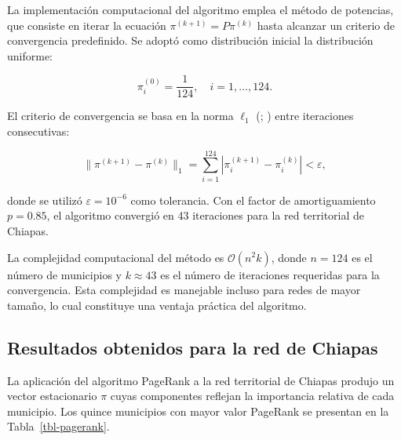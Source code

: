 \documentclass[
  spanish,
  us-letterpaper,
]{scrreprt}
\numberwithin{equation}{section}
\begin{document}
La implementación computacional del algoritmo emplea el método de
potencias, que consiste en iterar la ecuación
\(\pi^{(k+1)} = P\pi^{(k)}\) hasta alcanzar un criterio de convergencia
predefinido. Se adoptó como distribución inicial la distribución
uniforme:

\[
\pi^{(0)}_i = \frac{1}{124}, \quad i = 1, \dots, 124.
\]

El criterio de convergencia se basa en la norma \(\ell_1\)
(;
) entre
iteraciones consecutivas:

\[
\|\pi^{(k+1)} - \pi^{(k)}\|_1 = \sum_{i=1}^{124} |\pi^{(k+1)}_i - \pi^{(k)}_i| < \varepsilon,
\]

donde se utilizó \(\varepsilon = 10^{-6}\) como tolerancia. Con el
factor de amortiguamiento \(p = 0.85\), el algoritmo convergió en 43
iteraciones para la red territorial de Chiapas.

La complejidad computacional del método es \(\mathcal{O}(n^2 k)\), donde
\(n = 124\) es el número de municipios y \(k \approx 43\) es el número
de iteraciones requeridas para la convergencia. Esta complejidad es
manejable incluso para redes de mayor tamaño, lo cual constituye una
ventaja práctica del algoritmo.

\subsection{Resultados obtenidos para la red de
Chiapas}\label{resultados-obtenidos-para-la-red-de-chiapas}

La aplicación del algoritmo PageRank a la red territorial de Chiapas
produjo un vector estacionario \(\pi\) cuyas componentes reflejan la
importancia relativa de cada municipio. Los quince municipios con mayor
valor PageRank se presentan en la Tabla~\ref{tbl-pagerank}.
\end{document}
